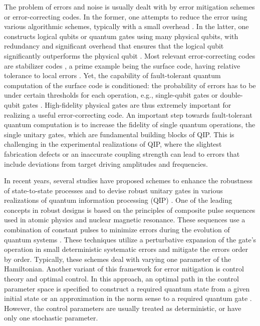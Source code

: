 \documentclass[floatfix,reprint, amsmath,amssymb,aps,superscriptaddress,nofootinbib]{revtex4-2}
\begin{document}
The problem of errors and noise is usually dealt with by error mitigation schemes or error-correcting codes. In the former, one attempts to reduce the error using various algorithmic schemes, typically with a small overhead \cite{Gottesman1997, Bravyi1998, Dennis2002, Raussendorf2006, Raussendorf2007a, Raussendorf2007b, Fowler2009, DiVincenzo2009, Fowler2011, Wootton2012, Fowler2013, Vijay2015, Bravyi2018}. In the latter, one constructs logical qubits or quantum gates using many physical qubits, with redundancy and significant overhead that ensures that the logical qubit significantly outperforms the physical qubit \cite{QuantumErrorCorrection}. Most relevant error-correcting codes are stabilizer codes \cite{Gottesman1997}, a prime example being the surface code, having relative tolerance to local errors \cite{Bravyi1998, Dennis2002}. Yet, the capability of fault-tolerant quantum computation of the surface code is conditioned: the probability of errors has to be under certain thresholds for each operation, e.g., single-qubit gates or double-qubit gates \cite{Gottesman1997, Bravyi1998, Dennis2002, Raussendorf2006, Raussendorf2007a, Raussendorf2007b, Fowler2009, DiVincenzo2009, Fowler2011, Wootton2012, Fowler2013, Vijay2015, Bravyi2018}. High-fidelity physical gates are thus extremely important for realizing a useful error-correcting code. An important step towards fault-tolerant quantum computation is to increase the fidelity of single quantum operations, the single unitary gates, which are fundamental building blocks of QIP. This is challenging in the experimental realizations of QIP, where the slightest fabrication defects or an inaccurate coupling strength can lead to errors that include deviations from target driving amplitudes and frequencies.

In recent years, several studies have proposed schemes to enhance the robustness of state-to-state processes \cite{Levitt1979,Shaka1987,Levitt1986,Timoney2008,trapped1,trapped2,atomic1,atomic2,atomic3,Erlich2019,Kyoseva2019} and to devise robust unitary gates in various realizations of quantum information processing (QIP) \cite{PhysRevResearch.2.043194,PhysRevA.101.012321,PhysRevB.102.075311,PhysRevA.104.012609,PhysRevA.103.052612,Torosov:2022gtb,Torosov:2022cdc,9774914}. One of the leading concepts in robust designs is based on the principles of composite pulse sequences used in atomic physics and nuclear magnetic resonance. These sequences use a combination of constant pulses to minimize errors during the evolution of quantum systems \cite{Levitt1979,Shaka1985,Shaka1987,Levitt1986,Timoney2008}. These techniques utilize a perturbative expansion of the gate's operation in small deterministic systematic errors and mitigate the errors order by order. Typically, these schemes deal with varying one parameter of the Hamiltonian. Another variant of this framework for error mitigation is control theory and optimal control. In this approach, an optimal path in the control parameter space is specified to construct a required quantum state from a given initial state or an approximation in the norm sense to a required quantum gate \cite{optimalcontrol1,optimalcontrol2,optimalcontrol3,optimalcontrol4,optimalcontrol5}. However, the control parameters are usually treated as deterministic, or have only one stochastic parameter.
\end{document}
